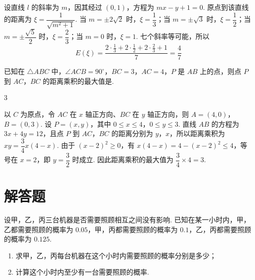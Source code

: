 \begin{solution}
设直线 \(l\) 的斜率为 \(m\)，因其经过 \((0,1)\)，方程为 \(mx-y+1=0\). 原点到该直线的距离为 \(\xi=\dfrac{1}{\sqrt{m^2+1}}\). 当 \(m=\pm2\sqrt{2}\) 时，\(\xi=\dfrac13\)；当 \(m=\pm\sqrt{3}\) 时，\(\xi=\dfrac12\)；当 \(m=\pm\dfrac{\sqrt{5}}2\) 时，\(\xi=\dfrac23\)；当 \(m=0\) 时，\(\xi=1\). 七个斜率等可能，所以
\[
E(\xi)=\frac{2\cdot\frac13+2\cdot\frac12+2\cdot\frac23+1}{7}=\frac47
\]
\end{solution}

\begin{problem}
已知在 \(\triangle ABC\) 中，\(\angle ACB = 90^{\circ}\)，\(BC = 3\)，\(AC = 4\)，\(P\) 是 \(AB\) 上的点，则点 \(P\) 到 \(AC\)，\(BC\) 的距离乘积的最大值是\fillinblank{}.
\end{problem}

\begin{answer}
3
\end{answer}

\begin{solution}
以 \(C\) 为原点，令 \(AC\) 在 \(x\) 轴正方向、\(BC\) 在 \(y\) 轴正方向，则 \(A=(4,0)\)，\(B=(0,3)\). 设 \(P=(x,y)\)，其中 \(0\leqslant x\leqslant4\)，\(0\leqslant y\leqslant3\). 直线 \(AB\) 的方程为 \(3x+4y=12\)，且点 \(P\) 到 \(AC\)，\(BC\) 的距离分别为 \(y\)，\(x\)，所以距离乘积为 \(xy=\dfrac34x(4-x)\). 由于 \((x-2)^2\geqslant0\)，有 \(x(4-x)=4-(x-2)^2\leqslant4\)，等号在 \(x=2\)，即 \(y=\dfrac32\) 时成立. 因此距离乘积的最大值为 \(\dfrac34\times4=3\).
\end{solution}

\section{解答题}
\begin{problem}
设甲，乙，丙三台机器是否需要照顾相互之间没有影响. 已知在某一小时内，甲，乙都需要照顾的概率为 \(0.05\)，甲，丙都需要照顾的概率为 \(0.1\)，乙，丙都需要照顾的概率为 \(0.125\).

\begin{enumerate}
\item 求甲，乙，丙每台机器在这个小时内需要照顾的概率分别是多少；
\item 计算这个小时内至少有一台需要照顾的概率.
\end{enumerate}
\end{problem}

